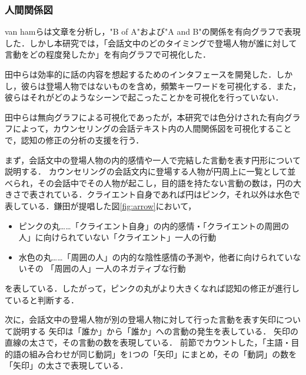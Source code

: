 \documentclass[shuuron]{kuee}
\begin{document}
\subsubsection{人間関係図}

van hamら\cite{van2009mapping}は文章を分析し，"B of A"および"A and B"の関係を有向グラフで表現した．しかし本研究では，「会話文中のどのタイミングで登場人物が誰に対して言動をどの程度発したか」を有向グラフで可視化した．

田中ら\cite{tanaka}は効率的に話の内容を想起するためのインタフェースを開発した．しかし，彼らは登場人物ではないものを含め，頻繁キーワードを可視化する．また，彼らはそれがどのようなシーンで起こったことかを可視化を行っていない．

田中らは無向グラフによる可視化であったが，本研究では色分けされた有向グラフによって，カウンセリングの会話テキスト内の人間関係図を可視化することで，認知の修正の分析の支援を行う．


まず，会話文中の登場人物の内的感情や一人で完結した言動を表す円形について説明する．
カウンセリングの会話文内に登場する人物が円周上に一覧として並べられ，その会話中でその人物が起こし，目的語を持たない言動の数は，円の大きさで表されている．クライエント自身であれば円はピンク，それ以外は水色で表している．鎌田\cite{鎌田穣2002臨床}が提唱した図\ref{fig:arrow}において，
\begin{itemize}
  \item ピンクの丸……「クライエント自身」の内的感情・「クライエントの周囲の人」に向けられていない「クライエント」一人の行動
  \item 水色の丸……「周囲の人」の内的な陰性感情の予測や，他者に向けられていないその
  「周囲の人」一人のネガティブな行動
\end{itemize}
を表している．したがって，ピンクの丸がより大きくなれば認知の修正が進行していると判断する．

次に，会話文中の登場人物が別の登場人物に対して行った言動を表す矢印について説明する
矢印は「誰か」から「誰か」への言動の発生を表している．
矢印の直線の太さで，その言動の数を表現している．
前節でカウントした，「主語・目的語の組み合わせが同じ動詞」を1つの「矢印」にまとめ，その「動詞」の数を「矢印」の太さで表現している．
\end{document}
